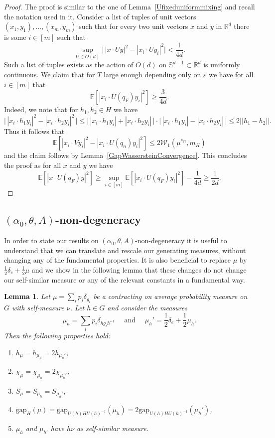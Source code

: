 \documentclass[10pt, english,oneside,reqno]{amsart}
\theoremstyle{plain}
\newtheorem{lemma}[theorem]{Lemma}
\theoremstyle{remark}
\numberwithin{equation}{section}
\numberwithin{figure}{section}
\newcommand{\eps}{\varepsilon}
\newcommand{\R}{\mathbb{R}}
\newcommand{\E}{\mathbb{E}}
\newcommand{\Haarof}[1]{m_{#1}}
\begin{document}
\begin{proof}
    The proof is similar to the one of Lemma~\ref{Ufixeduniformmixing} and recall the notation used in it. Consider a list of tuples of unit vectors $(x_1,y_1), \ldots ,(x_m, y_m)$ such that for every two unit vectors $x$ and $y$ in $\R^d$ there is some $i \in [m]$ such that $$\sup_{U \in O(d)}\Big| \, |x\cdot U y|^2 - |x_i \cdot U y_i|^2 \Big| < \frac{1}{4d}.$$ Such a list of tuples exists as the action of $O(d)$ on $\mathbb{S}^{d-1}\subset \R^d$ is uniformly continuous. We claim that for $T$ large enough depending only on $\eps$ we have for all $i \in [m]$ that $$\E[|x_i \cdot U(q_F)y_i|^2] \geq \frac{3}{4d}.$$ Indeed, we note that for $h_1, h_2 \in H$ we have $$\big|\,|x_i \cdot h_1y_i|^2 - |x_i \cdot h_2y_i|^2\,\big| \leq \big|\,|x_i \cdot h_1y_i| + |x_i \cdot h_2y_i|\,\big| \cdot \big|\,|x_i \cdot h_1y_i| - |x_i \cdot h_2y_i|\,\big| \leq 2||h_1 - h_2||.$$ Thus it follows that $$\E[|x_i \cdot Vy_i|^2 - |x_i \cdot U(q_n)y_i|^2] \leq 2\mathcal{W}_1(\mu^{*n},\Haarof{H})$$ and the claim follows by Lemma~\ref{GapWassersteinConvergence}. This concludes the proof as for all $x$ and $y$ we have $$\E[|x \cdot U(q_F)y|^2] \geq \sup_{i \in [m]} \E[|x_i \cdot U(q_F)y_i|^2] - \frac{1}{4d} \geq \frac{1}{2d}.$$
\end{proof}




\subsection{$(\alpha_0, \theta, A)$-non-degeneracy}\label{section:non-deg}
 

In order to state our results on $(\alpha_0, \theta, A)$-non-degeneracy it is useful to understand that we can translate and rescale our generating measures, without changing any of the fundamental properties. It is also beneficial to replace $\mu$ by $\frac{1}{2}\delta_e + \frac{1}{2}\mu$ and we show in the following lemma that these changes do not change our self-similar measure or any of the relevant constants in a fundamental way. 

\begin{lemma}\label{ConjugationLemma}
    Let $\mu = \sum_{i} p_i \delta_{g_i}$ be a contracting on average probability measure on $G$ with self-measure $\nu$. Let $h \in G$ and consider the measures $$\mu_h = \sum_i p_i \delta_{hg_ih^{-1}} \quad \text{ and } \quad \mu_h' = \frac{1}{2}\delta_e + \frac{1}{2}\mu_h.$$ Then the following properties hold: 
    \begin{enumerate}[label = (\roman*)]
        \item $h_{\mu} = h_{\mu_h} = 2h_{\mu_h'}$,
        \item $\chi_{\mu} = \chi_{\mu_h} = 2\chi_{\mu_h'}$,
        \item $S_{\mu} = S_{\mu_h} = S_{\mu_h'}$,
        \item $\mathrm{gap}_H(\mu) = \mathrm{gap}_{U(h)HU(h)^{-1}}(\mu_h) = 2\mathrm{gap}_{U(h)HU(h)^{-1}}(\mu_h')$,
        \item $\mu_h$ and $\mu_{h'}$ have $h\nu$ as self-similar measure.
    \end{enumerate}
\end{lemma}
\end{document}
